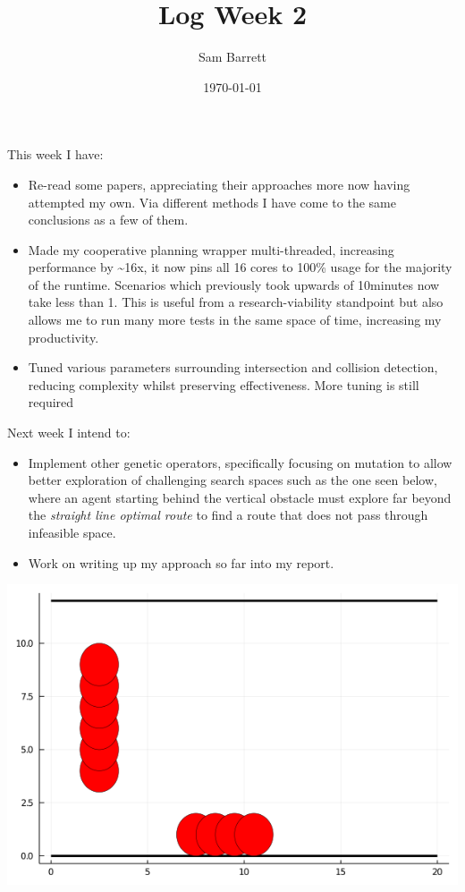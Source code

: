 \documentclass[11pt]{article}
\author{Sam Barrett}
\date{\today}
\title{Log Week 2}
\begin{document}
\maketitle
This week I have:

\begin{itemize}
\item Re-read some papers, appreciating their approaches more now having attempted my own. Via different methods I have come to the same conclusions as a few of them.
\item Made my cooperative planning wrapper multi-threaded, increasing performance by \textasciitilde{}16x, it now pins all 16 cores to 100\% usage for the majority of the runtime. Scenarios which previously took upwards of 10minutes now take less than 1. This is useful from a research-viability standpoint but also allows me to run many more tests in the same space of time, increasing my productivity.
\item Tuned various parameters surrounding intersection and collision detection, reducing complexity whilst preserving effectiveness. More tuning is still required
\end{itemize}

Next week I intend to:

\begin{itemize}
\item Implement other genetic operators, specifically focusing on mutation to allow better exploration of challenging search spaces such as the one seen below, where an agent starting behind the vertical obstacle must explore far beyond the \emph{straight line optimal route} to find a route that does not pass through infeasible space.
\item Work on writing up my approach so far into my report.
\end{itemize}



\begin{center}
\includegraphics[width=.9\linewidth]{./road_graph.png}
\end{center}
\end{document}
